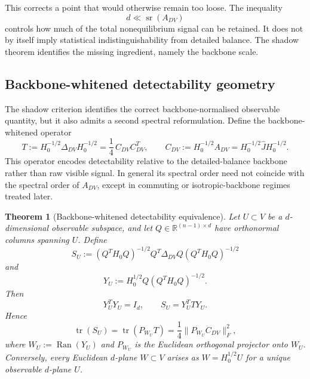 \documentclass[11pt,a4paper]{article}
\numberwithin{equation}{section}
\theoremstyle{thmcompact}
\newtheorem{theorem}{Theorem}[section]
\theoremstyle{remark}
\begin{document}
This corrects a point that would otherwise remain too loose. The inequality
\begin{equation}
d\ll \operatorname{sr}(A_{DV})
\end{equation}
controls how much of the total nonequilibrium signal can be retained. It does not by itself imply statistical indistinguishability from detailed balance. The shadow theorem identifies the missing ingredient, namely the backbone scale.


\subsection{Backbone-whitened detectability geometry}

The shadow criterion identifies the correct backbone-normalised observable quantity, but it also admits a second spectral reformulation. Define the backbone-whitened operator
\begin{equation}
T:=H_0^{-1/2}\Delta_{DV}H_0^{-1/2}
=\frac14\,C_{DV}C_{DV}^{T},
\qquad
C_{DV}:=H_0^{-1/2}A_{DV}=H_0^{-1/2}\widehat J H_0^{-1/2}.
\end{equation}
This operator encodes detectability relative to the detailed-balance backbone rather than raw visible signal. In general its spectral order need not coincide with the spectral order of \(A_{DV}\), except in commuting or isotropic-backbone regimes treated later.

\begin{theorem}[Backbone-whitened detectability equivalence]
\label{thm:backbone_whitened_detectability_equivalence}
Let \(U\subset V\) be a \(d\)-dimensional observable subspace, and let \(Q\in\mathbb R^{(n-1)\times d}\) have orthonormal columns spanning \(U\). Define
\begin{equation}
S_U:=(Q^T H_0 Q)^{-1/2}Q^T\Delta_{DV}Q(Q^T H_0 Q)^{-1/2}
\end{equation}
and
\begin{equation}
Y_U:=H_0^{1/2}Q(Q^T H_0 Q)^{-1/2}.
\end{equation}
Then
\begin{equation}
Y_U^T Y_U=I_d,
\qquad
S_U=Y_U^T T Y_U.
\end{equation}
Hence
\begin{equation}
\operatorname{tr}(S_U)=\operatorname{tr}(P_{W_U}T)=\frac14\|P_{W_U}C_{DV}\|_F^2,
\end{equation}
where \(W_U:=\operatorname{Ran}(Y_U)\) and \(P_{W_U}\) is the Euclidean orthogonal projector onto \(W_U\). Conversely, every Euclidean \(d\)-plane \(W\subset V\) arises as \(W=H_0^{1/2}U\) for a unique observable \(d\)-plane \(U\).
\end{theorem}
\end{document}
